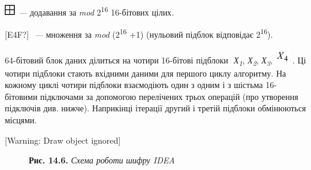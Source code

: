  \includegraphics[width=0.1874in,height=0.1874in]{crypt-img/crypt-img300.png}
\textit{ --- }додавання за \textit{mod}\textit{ }2\textsuperscript{16}\textit{ 
}16-бітових цілих\textit{.}

\textlatin{[E4F?]} $ $ \textit{--- }множення за \textit{mod}
(2\textsuperscript{16} +1) (нульовий підблок відповідає 2\textsuperscript{16}).

 64-бітовий блок даних ділиться на чотири 16-бітові підблоки  $ $
\textit{Х}\textit{\textsubscript{1}}, \textit{Х}\textit{\textsubscript{2}},
\textit{Х}\textit{\textsubscript{3}}, 
\includegraphics[width=0.25in,height=0.25in]{crypt-img/crypt-img301.png} . Ці
чотири підблоки стають вхідними даними для першого циклу алгоритму. На кожному
циклі чотири підблоки взаємодіють один з одним і з шістьма 16-бітовими 
підключами за допомогою перелічених трьох операцій (про утворення підключів
див. нижче).  Наприкінці ітерації  другий  і третій підблоки обмінюються 
місцями. 


\bigskip

[Warning: Draw object ignored]


\bigskip


\bigskip


\bigskip


\bigskip


\bigskip


\bigskip


\bigskip


\bigskip


\bigskip


\bigskip


\bigskip


\bigskip


\bigskip


\bigskip


\bigskip


\bigskip


\bigskip


\bigskip


\bigskip


\bigskip


\bigskip



\begin{figure}
\centering
\begin{minipage}{}
{\centering
\textbf{Рис. 14.6.} \textit{Схема роботи }\textit{шифру IDEA}
\par}
\end{minipage}
\end{figure}

